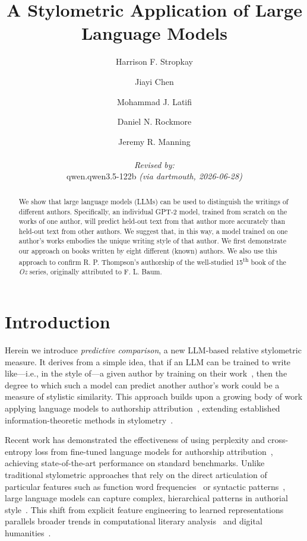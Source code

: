 \documentclass[11pt]{article}
\title{A Stylometric Application of Large Language Models}
\author{
  Harrison F. Stropkay \and Jiayi Chen \and Mohammad J. Latifi \and Daniel N. Rockmore \and Jeremy R. Manning
  \par\hrule\par
  \textit{Revised by:}\\
  qwen.qwen3.5-122b \textit{(via dartmouth, 2026-06-28)}
}
\begin{document}
\maketitle

\begin{abstract}

We show that large language models (LLMs) can be used to distinguish the
writings of different authors. Specifically, an individual GPT-2 model, trained
from scratch on the works of one author, will predict held-out text from that
author more accurately than held-out text from other authors. We suggest that,
in this way, a model trained on one author's works embodies the unique writing
style of that author. We first demonstrate our approach on books written by
eight different (known) authors. We also use this approach to confirm R. P.
Thompson's authorship of the well-studied 15\textsuperscript{th} book of the
\textit{Oz} series, originally attributed to F. L. Baum.

\end{abstract}

\section{Introduction}

Herein we introduce {\em predictive comparison}, a new LLM-based relative
stylometric measure. It derives from a simple idea, that if an LLM can be
trained to write like---i.e., in the style of---a given author by training on
their work~\citep[e.g., ][]{Mikr25}, then the degree to which such a model can
predict another author's work could be a measure of stylistic similarity. This
approach builds upon a growing body of work applying language models to
authorship attribution~\citep{HuanEtal25,UcheEtal20}, extending established
information-theoretic methods in stylometry~\citep{JuolBaay05,ZhaoEtal06}.

Recent work has demonstrated the effectiveness of using perplexity and
cross-entropy loss from fine-tuned language models for authorship
attribution~\citep{HuanEtal25}, achieving state-of-the-art performance on
standard benchmarks. Unlike traditional stylometric approaches that rely on the
direct articulation of particular features such as function word
frequencies~\citep{MostWall63} or syntactic patterns~\citep{Holm98}, large
language models can capture complex, hierarchical patterns in authorial
style~\citep{FabiEtal20}. This shift from explicit feature engineering to
learned representations parallels broader trends in computational literary
analysis~\citep{More00,UndeEtal19} and digital humanities~\citep{HughEtal12}.
\end{document}
